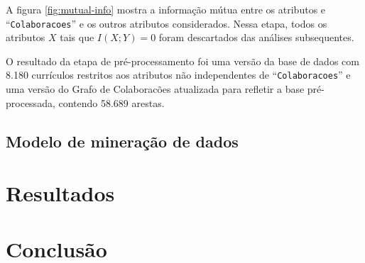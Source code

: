 \documentclass[12pt]{article}
\begin{document}
A figura \ref{fig:mutual-info} mostra a informação mútua entre os atributos e ``\texttt{Colaboracoes}'' e os outros atributos considerados.
Nessa etapa, todos os atributos $X$ tais que $I(X; Y) = 0$ foram descartados das análises subsequentes.

O resultado da etapa de pré-processamento foi uma versão da base de dados com 8.180 currículos restritos aos atributos não independentes de ``\texttt{Colaboracoes}'' e uma versão do Grafo de Colaboracões atualizada para refletir a base pré-processada, contendo 58.689 arestas.

\subsection{Modelo de mineração de dados}
\label{sec:datamine}

\section{Resultados}
\label{sec:results}

\section{Conclusão}
\label{sec:conclusion}



\end{document}
